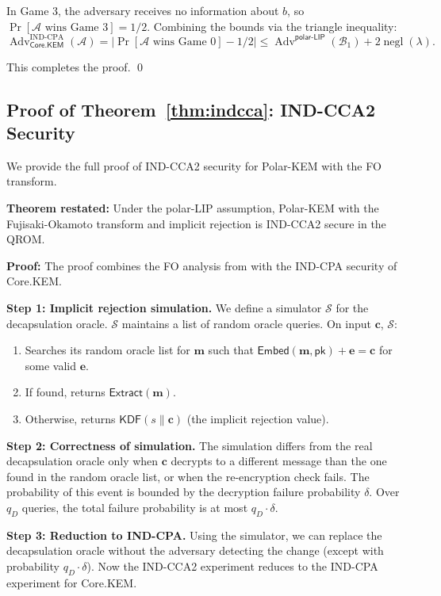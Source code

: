 \documentclass[11pt,a4paper]{article}
\newcommand{\polarKem}{\textsf{Polar-KEM}\xspace}
\newcommand{\CoreKEM}{\textsf{Core.KEM}\xspace}
\newcommand{\FO}{\textsf{FO}\xspace}
\newcommand{\KDF}{\textsf{KDF}\xspace}
\newcommand{\Extract}{\textsf{Extract}\xspace}
\newcommand{\polarLIP}{\textsf{polar-LIP}\xspace}
\newcommand{\INDCPA}{\textsf{IND-CPA}\xspace}
\newcommand{\INDCCA}{\textsf{IND-CCA2}\xspace}
\newcommand{\QROM}{\textsf{QROM}\xspace}
\DeclareMathOperator{\negl}{negl}
\DeclareMathOperator{\Adv}{Adv}
\newcommand{\pk}{\mathsf{pk}}
\begin{document}
In Game 3, the adversary receives no information about $b$, so $\Pr[\mathcal{A} \text{ wins Game 3}] = 1/2$. Combining the bounds via the triangle inequality:
\[
\Adv_{\CoreKEM}^{\text{IND-CPA}}(\mathcal{A}) = |\Pr[\mathcal{A} \text{ wins Game 0}] - 1/2| \leq \Adv^{\polarLIP}(\mathcal{B}_1) + 2\negl(\lambda).
\]

This completes the proof. \qed

\subsection{Proof of Theorem~\ref{thm:indcca}: IND-CCA2 Security}\label{app:indcca-proof}

We provide the full proof of \INDCCA security for \polarKem with the \FO transform.

\textbf{Theorem restated:} Under the \polarLIP assumption, \polarKem with the Fujisaki-Okamoto transform and implicit rejection is \INDCCA secure in the \QROM.

\textbf{Proof:} The proof combines the \FO analysis from \cite{HofheinzHoewmannsKiltz} with the \INDCPA security of \CoreKEM.

\textbf{Step 1: Implicit rejection simulation.} We define a simulator $\mathcal{S}$ for the decapsulation oracle. $\mathcal{S}$ maintains a list of random oracle queries. On input $\mathbf{c}$, $\mathcal{S}$:
\begin{enumerate}[leftmargin=2em]
\item Searches its random oracle list for $\mathbf{m}$ such that $\mathsf{Embed}(\mathbf{m}, \pk) + \mathbf{e} = \mathbf{c}$ for some valid $\mathbf{e}$.
\item If found, returns $\Extract(\mathbf{m})$.
\item Otherwise, returns $\KDF(s \| \mathbf{c})$ (the implicit rejection value).
\end{enumerate}

\textbf{Step 2: Correctness of simulation.} The simulation differs from the real decapsulation oracle only when $\mathbf{c}$ decrypts to a different message than the one found in the random oracle list, or when the re-encryption check fails. The probability of this event is bounded by the decryption failure probability $\delta$. Over $q_D$ queries, the total failure probability is at most $q_D \cdot \delta$.

\textbf{Step 3: Reduction to IND-CPA.} Using the simulator, we can replace the decapsulation oracle without the adversary detecting the change (except with probability $q_D \cdot \delta$). Now the \INDCCA experiment reduces to the \INDCPA experiment for \CoreKEM.
\end{document}
